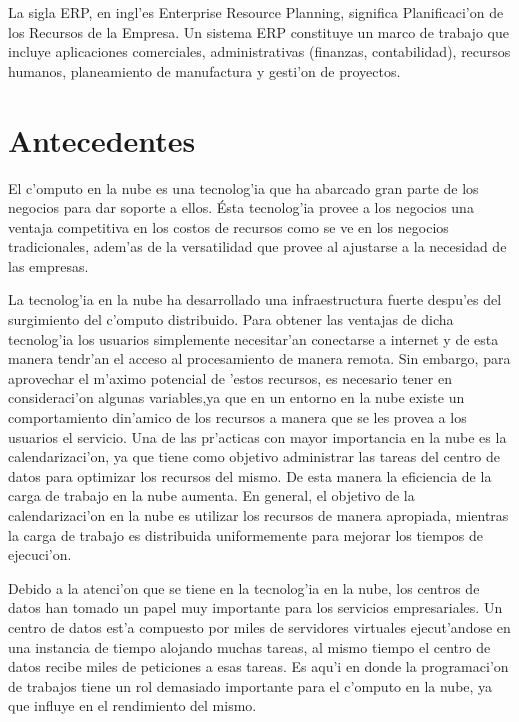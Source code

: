 La sigla ERP, en ingl'es Enterprise Resource Planning, significa Planificaci'on de los Recursos de la Empresa. Un sistema ERP constituye un marco de trabajo que incluye aplicaciones comerciales, administrativas (finanzas, contabilidad), recursos humanos, planeamiento de manufactura y gesti'on de proyectos. \cite{saroka2002sistemas}


\section*{Antecedentes}

El c'omputo en la nube es una tecnolog'ia que ha abarcado gran parte de los negocios  para dar soporte a ellos. Ésta tecnolog'ia provee a los negocios una ventaja competitiva en los costos de recursos como se ve en los negocios tradicionales, adem'as de la versatilidad que provee al ajustarse a la necesidad de las empresas. \cite{srinivasan2014cloud}

La tecnolog'ia en la nube ha desarrollado una infraestructura fuerte despu'es del surgimiento del c'omputo distribuido.\cite{chen2009cloud} Para obtener las ventajas de dicha tecnolog'ia los usuarios simplemente necesitar'an conectarse a internet y de esta manera tendr'an el acceso al procesamiento de manera remota.\cite{aranganathan2011aco} Sin embargo, para aprovechar el m'aximo potencial de 'estos recursos, es necesario tener en consideraci'on algunas variables,ya que en un entorno en la nube existe un comportamiento din'amico de los recursos a manera que se les provea a los usuarios el servicio.\cite{shimpy2014different}
Una de las pr'acticas con mayor importancia en la nube es la calendarizaci'on, ya que tiene como objetivo administrar las tareas del centro de datos para optimizar los recursos del mismo. De esta manera la eficiencia de la carga de trabajo en la nube aumenta.\cite{shimpy2014different}
En general, el objetivo de la calendarizaci'on en la nube es utilizar los recursos de manera apropiada, mientras la carga de trabajo es distribuida uniformemente para mejorar los tiempos de ejecuci'on.\cite{shimpy2014different}

Debido a la atenci'on que se tiene en la tecnolog'ia en la nube, los centros de datos han tomado un papel muy importante para los servicios empresariales.\cite{shimpy2014different} Un centro de datos est'a compuesto por miles de servidores virtuales ejecut'andose en una instancia de tiempo alojando muchas tareas, al mismo tiempo el centro de datos recibe miles de peticiones a esas tareas. Es aqu'i en donde la programaci'on de trabajos tiene un rol demasiado importante para el c'omputo en la nube, ya que influye en el rendimiento del mismo.\cite{srinivasan2014cloud} 

